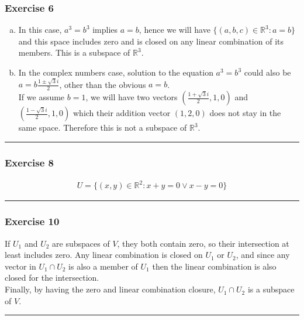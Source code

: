 \documentclass[12pt, letterpaper]{scrartcl}
\newcommand{\R}{\mathbb{R}}
\begin{document}
\subsubsection*{Exercise 6} 
\begin{enumerate}[(a)]
    \item In this case, $a^3=b^3$ implies $a=b$, hence we will have $\{(a,b,c)\in \R^3:a=b\}$ and this space includes zero and is closed on any linear combination of its members. This is a subspace of $\R^3$.

    \item In the complex numbers case, solution to the equation $a^3=b^3$ could also be $a=b\frac{1\pm\sqrt{3}i}{2}$, other than the obvious $a=b$.\\
    If we assume $b=1$, we will have two vectors $(\frac{1+\sqrt{3}i}{2},1,0)$ and $(\frac{1-\sqrt{3}i}{2},1,0)$ which their addition vector $(1,2,0)$ does not stay in the same space. Therefore this is not a subspace of $\R^3$.
\end{enumerate}
\vskip1mm\hrule
\subsubsection*{Exercise 8}
\begin{align*}
    U=\{(x,y)\in \R^2: x+y=0 \vee x-y=0\}
\end{align*}
\vskip1mm\hrule
\subsubsection*{Exercise 10} 
If $U_1$ and $U_2$ are subspaces of $V$, they both contain zero, so their intersection at least includes zero. Any linear combination is closed on $U_1$ or $U_2$, and since any vector in $U_1\cap U_2$ is also a member of $U_1$ then the linear combination is also closed for the intersection.\\ Finally, by having the zero and linear combination closure, $U_1\cap U_2$ is a subspace of $V$.
\vskip1mm\hrule
\end{document}
